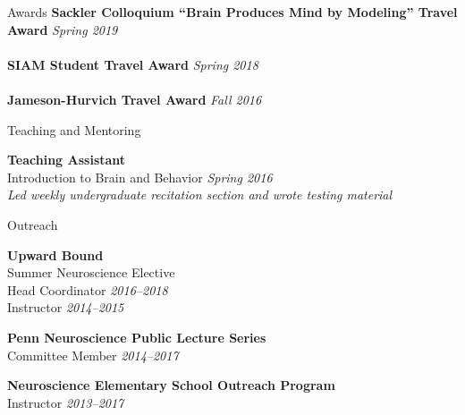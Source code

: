 \documentclass{resume} %
\begin{document}
\begin{rSection}{Awards}
    \textbf{Sackler Colloquium ``Brain Produces Mind by Modeling'' Travel Award} \hfill \emph{Spring 2019} \\
    \\
    \textbf{SIAM Student Travel Award} \hfill \emph{Spring 2018} \\
    \\
    \textbf{Jameson-Hurvich Travel Award} \hfill \emph{Fall 2016} \\
\end{rSection}


\begin{rSection}{Teaching and Mentoring}

\textbf{Teaching Assistant} \\
Introduction to Brain and Behavior \hfill \emph{Spring 2016} \\
\emph{Led weekly undergraduate recitation section and wrote testing material}
\end{rSection}


\begin{rSection}{Outreach}

\textbf{Upward Bound}\\
Summer Neuroscience Elective \\
Head Coordinator \hfill \emph{2016--2018} \\
Instructor \hfill \emph{2014--2015}

\textbf{Penn Neuroscience Public Lecture Series}\\
Committee Member \hfill \emph{2014--2017}

\textbf{Neuroscience Elementary School Outreach Program}\\
Instructor \hfill \emph{2013--2017}

\end{rSection}

\end{document}

